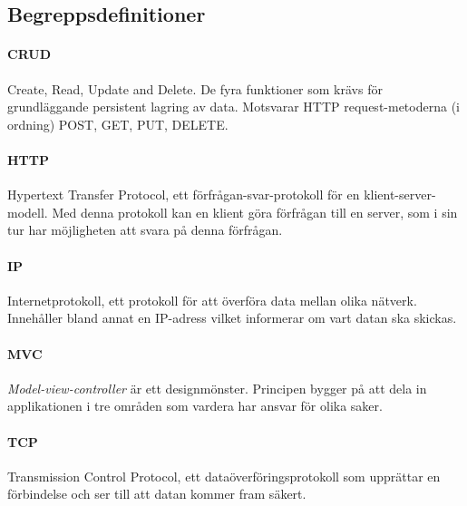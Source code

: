 \subsection{Begreppsdefinitioner}
\label{subsec:definitions}

\paragraph{CRUD}
Create, Read, Update and Delete. De fyra funktioner som krävs för grundläggande persistent lagring av data. Motsvarar HTTP request-metoderna (i ordning) POST, GET, PUT, DELETE.

\paragraph{HTTP}
Hypertext Transfer Protocol, ett förfrågan-svar-protokoll för en klient-server-modell. Med denna protokoll kan en klient göra förfrågan till en server, som i sin tur har möjligheten att svara på denna förfrågan. \parencite{http}

\paragraph{IP} 
Internetprotokoll, ett protokoll för att överföra data mellan olika nätverk. Innehåller bland annat en IP-adress vilket informerar om vart datan ska skickas. \parencite{inetF1}

\paragraph{MVC}
\textit{Model-view-controller} är ett designmönster. Principen bygger på att dela in applikationen i tre områden som vardera har ansvar för olika saker. \parencite{MVC}

\paragraph{TCP}
Transmission Control Protocol, ett dataöverföringsprotokoll som upprättar en förbindelse och ser till att datan kommer fram säkert. \parencite{inetF1}
